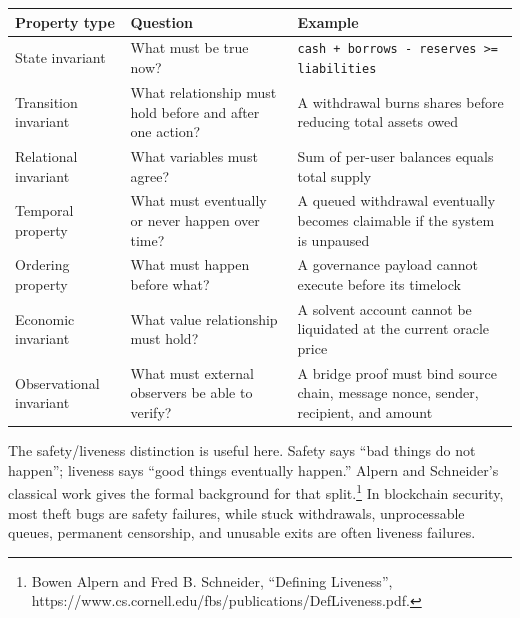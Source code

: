 {\def\LTcaptype{none} %
\begin{longtable}[]{@{}
  >{\raggedright\arraybackslash}p{}
  >{\raggedright\arraybackslash}p{}
  >{\raggedright\arraybackslash}p{}@{}}
\toprule\noalign{}
\begin{minipage}[b]{\linewidth}\raggedright
Property type
\end{minipage} & \begin{minipage}[b]{\linewidth}\raggedright
Question
\end{minipage} & \begin{minipage}[b]{\linewidth}\raggedright
Example
\end{minipage} \\
\midrule\noalign{}
\endhead
\bottomrule\noalign{}
\endlastfoot
State invariant & What must be true now? &
\passthrough{\lstinline!cash + borrows - reserves >= liabilities!} \\
Transition invariant & What relationship must hold before and after one
action? & A withdrawal burns shares before reducing total assets owed \\
Relational invariant & What variables must agree? & Sum of per-user
balances equals total supply \\
Temporal property & What must eventually or never happen over time? & A
queued withdrawal eventually becomes claimable if the system is
unpaused \\
Ordering property & What must happen before what? & A governance payload
cannot execute before its timelock \\
Economic invariant & What value relationship must hold? & A solvent
account cannot be liquidated at the current oracle price \\
Observational invariant & What must external observers be able to
verify? & A bridge proof must bind source chain, message nonce, sender,
recipient, and amount \\
\end{longtable}
}

The safety/liveness distinction is useful here. Safety says ``bad things
do not happen''; liveness says ``good things eventually happen.'' Alpern
and Schneider's classical work gives the formal background for that
split.\footnote{Bowen Alpern and Fred B. Schneider, ``Defining
  Liveness'',
  https://www.cs.cornell.edu/fbs/publications/DefLiveness.pdf.} In
blockchain security, most theft bugs are safety failures, while stuck
withdrawals, unprocessable queues, permanent censorship, and unusable
exits are often liveness failures.

